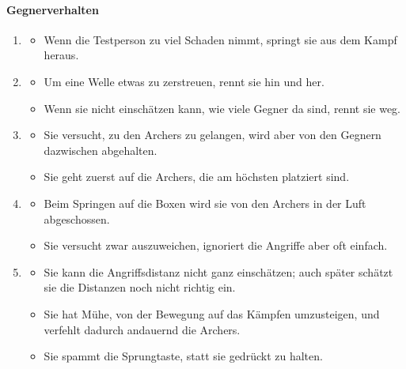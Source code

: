 \documentclass[../Main.tex]{subfiles}
\begin{document}
\paragraph{Gegnerverhalten}
\begin{enumerate}[label=\textbf{B\arabic*}, leftmargin=1.5cm, itemsep=0.8em]
    \item
        \begin{itemize}[nosep]
            \item Wenn die Testperson zu viel Schaden nimmt, springt sie aus dem Kampf heraus.
        \end{itemize}
    \item
        \begin{itemize}[nosep]
            \item Um eine Welle etwas zu zerstreuen, rennt sie hin und her.
            \item Wenn sie nicht einschätzen kann, wie viele Gegner da sind, rennt sie weg.
        \end{itemize}
    \item
        \begin{itemize}[nosep]
            \item Sie versucht, zu den Archers zu gelangen, wird aber von den Gegnern dazwischen abgehalten.
            \item Sie geht zuerst auf die Archers, die am höchsten platziert sind.
        \end{itemize}
    \item
        \begin{itemize}[nosep]
            \item Beim Springen auf die Boxen wird sie von den Archers in der Luft abgeschossen.
            \item Sie versucht zwar auszuweichen, ignoriert die Angriffe aber oft einfach.
        \end{itemize}
    \item
        \begin{itemize}[nosep]
            \item Sie kann die Angriffsdistanz nicht ganz einschätzen; auch später schätzt sie die Distanzen noch nicht richtig ein.
            \item Sie hat Mühe, von der Bewegung auf das Kämpfen umzusteigen, und verfehlt dadurch andauernd die Archers.
            \item Sie spammt die Sprungtaste, statt sie gedrückt zu halten.
        \end{itemize}
\end{enumerate}
\end{document}
